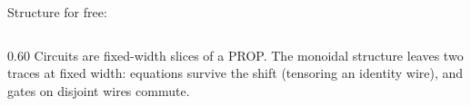 \begin{frame}{Structure for free:  \InPaper}
\begin{columns}[c]
\begin{column}{0.60\textwidth}
Circuits are fixed-width slices of a \alert{PROP}. The monoidal structure leaves
two traces at fixed width: equations survive the \alert{shift} (tensoring an
identity wire), and gates on \alert{disjoint wires commute}.
\begin{code}%
\>[0]\AgdaSpace{}%
\AgdaSpace{}%
\AgdaSymbol{:}\AgdaSpace{}%
\AgdaSymbol{(}\AgdaSpace{}%
\AgdaSymbol{:}\AgdaSpace{}%
\AgdaSymbol{)}\AgdaSpace{}%
\AgdaSpace{}%
\AgdaSpace{}%
\AgdaSpace{}%
\<%
\\
\>[0][@{}l@{\AgdaIndent{0}}]%
\>[2]%
\>[8]\AgdaSymbol{:}\AgdaSpace{}%
\AgdaSpace{}%
\AgdaSpace{}%
\AgdaSpace{}%
\AgdaOperator{\AgdaDatatype{===}}\AgdaSpace{}%
\AgdaSpace{}%
\AgdaSpace{}%
\AgdaSpace{}%
\AgdaSpace{}%
\AgdaSpace{}%
\AgdaOperator{\AgdaDatatype{===}}\AgdaSpace{}%
\<%
\\
%
\>[2]\AgdaSpace{}%
\AgdaSymbol{:}\AgdaSpace{}%
\AgdaSpace{}%
\AgdaSpace{}%
\AgdaSpace{}%
\AgdaOperator{\AgdaDatatype{===}}\AgdaSpace{}%
\AgdaSpace{}%
\AgdaSpace{}%
\AgdaSymbol{(}\AgdaSpace{}%
\AgdaSymbol{)}\AgdaSpace{}%
\AgdaSpace{}%
\AgdaSpace{}%
\AgdaSpace{}%
\AgdaOperator{\AgdaDatatype{===}}\AgdaSpace{}%
\AgdaSpace{}%
\<%
\\
%
\>[2]\AgdaSpace{}%
\AgdaSymbol{:}%
\>[242I]\AgdaSymbol{(}\AgdaSpace{}%
\AgdaSymbol{:}\AgdaSpace{}%
\AgdaSpace{}%
\AgdaSymbol{)}\AgdaSpace{}%
\AgdaSymbol{(}\AgdaSpace{}%
\AgdaSymbol{:}\AgdaSpace{}%
\AgdaSpace{}%
\AgdaSymbol{)}\AgdaSpace{}%
\<%

\end{code}
\end{column}
\end{columns}
\end{frame}
